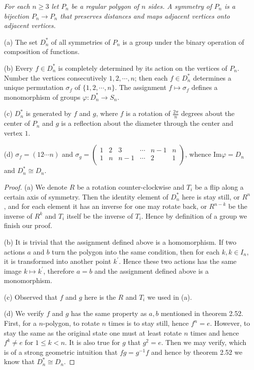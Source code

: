 \begin{problem}\em
For each $n\ge 3$ let $P_n$ be a regular polygon of $n$ sides. A symmetry of $P_n$ is a bijection $P_n\to P_n$ that preserves distances and maps adjacent vertices onto adjacent vertices.\par
(a) The set $D_n^*$ of all symmetries of $P_n$ is a group under the binary operation of composition of functions.\par
(b) Every $f\in D_n^*$ is completely determined by its action on the vertices of $P_n$. Number the vertices consecutively $1,2,\cdots,n$; then each $f\in D_n^*$ determines a unique permutation $\sigma_f$ of $\{1,2,\cdots,n\}$. The assignment $f\mapsto\sigma_f$ defines a monomorphism of groups $\varphi:D_n^*\to S_n$.\par
(c) $D_n^*$ is generated by $f$ and $g$, where $f$ is a rotation of $\frac{2\pi}{n}$ degrees about the center of $P_n$ and $g$ is a reflection about the diameter through the center and vertex $1$.\par
(d) $\sigma_f=(12\cdots n)$ and $
\sigma _g=\left( \begin{matrix}
	1&		2&		3&		\cdots&		n-1&		n\\
	1&		n&		n-1&		\cdots&		2&		1\\
\end{matrix} \right) 
$, whence $\mathrm{Im}\varphi=D_n$ and $D_n^*\cong D_n$.
\end{problem}
\begin{proof}
(a) We denote $R$ be a rotation counter-clockwise and $T_i$ be a flip along a certain axis of symmetry. Then the identity element of $D_n^*$ here is stay still, or $R^n$, and for each element it has an inverse for one may rotate back, or $R^{n-k}$ be the inverse of $R^k$ and $T_i$ itself be the inverse of $T_i$. Hence by definition of a group we finish our proof.\par
(b) It is trivial that the assignment defined above is a homomorphism. If two actions $a$ and $b$ turn the polygon into the same condition, then for each $k,k\in I_n$, it is transformed into another point $k^\prime$. Hence these two actions has the same image $k\mapsto k^\prime$, therefore $a=b$ and the assignment defined above is a monomorphism.\par
(c) Observed that $f$ and $g$ here is the $R$ and $T_i$ we used in (a).\par
(d) We verify $f$ and $g$ has the same property as $a,b$ mentioned in theorem 2.52. First, for a $n$-polygon, to rotate $n$ times is to stay still, hence $f^n=e$. However, to stay the same as the original state one must at least rotate $n$ times and hence $f^k\ne e$ for $1\le k<n$. It is also true for $g$ that $g^2=e$. Then we may verify, which is of a strong geometric intuition that $fg=g^{-1}f$ and hence by theorem 2.52 we know that $D_n^*\cong D_n$.
\end{proof}
